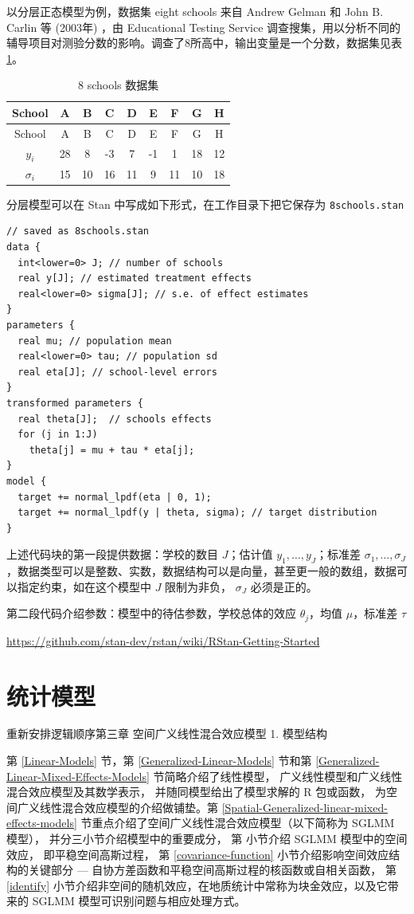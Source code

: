 \documentclass[12pt,a4paper,UTF8,twoside]{book}
\theoremstyle{definition}
\theoremstyle{definition}
\theoremstyle{definition}
\theoremstyle{remark}
\begin{document}
以分层正态模型为例，数据集 eight schools 来自 Andrew Gelman 和 John B.
Carlin 等 (2003年) \citep{Gelman2003}，由 Educational Testing Service
调查搜集，用以分析不同的辅导项目对测验分数的影响。调查了8所高中，输出变量是一个分数，数据集见表
\ref{tab:eight-high-schools}。

\begin{longtable}[]{@{}ccccccccc@{}}
\caption{\label{tab:eight-high-schools} 8 schools 数据集}\tabularnewline
\toprule
School & A & B & C & D & E & F & G & H\tabularnewline
\midrule
\endfirsthead
\toprule
School & A & B & C & D & E & F & G & H\tabularnewline
\midrule
\endhead
\(y_i\) & 28 & 8 & -3 & 7 & -1 & 1 & 18 & 12\tabularnewline
\(\sigma_i\) & 15 & 10 & 16 & 11 & 9 & 11 & 10 & 18\tabularnewline
\bottomrule
\end{longtable}

分层模型可以在 Stan 中写成如下形式，在工作目录下把它保存为
\texttt{8schools.stan}

\begin{verbatim}
// saved as 8schools.stan
data {
  int<lower=0> J; // number of schools 
  real y[J]; // estimated treatment effects
  real<lower=0> sigma[J]; // s.e. of effect estimates 
}
parameters {
  real mu; // population mean
  real<lower=0> tau; // population sd
  real eta[J]; // school-level errors
}
transformed parameters {
  real theta[J];  // schools effects
  for (j in 1:J)
    theta[j] = mu + tau * eta[j];
}
model {
  target += normal_lpdf(eta | 0, 1);
  target += normal_lpdf(y | theta, sigma); // target distribution
}
\end{verbatim}

上述代码块的第一段提供数据：学校的数目 \(J\)；估计值
\(y_1,\ldots,y_{J}\)；标准差
\(\sigma_1,\ldots,\sigma_{J}\)，数据类型可以是整数、实数，数据结构可以是向量，甚至更一般的数组，数据可以指定约束，如在这个模型中
\(J\) 限制为非负， \(\sigma_{J}\) 必须是正的。

第二段代码介绍参数：模型中的待估参数，学校总体的效应 \(\theta_j\)，均值
\(\mu\)，标准差 \(\tau\)

\url{https://github.com/stan-dev/rstan/wiki/RStan-Getting-Started}

\hypertarget{models}{%
\chapter{统计模型}\label{models}}

{重新安排逻辑顺序第三章 空间广义线性混合效应模型 1. 模型结构}

第 \ref{Linear-Models} 节，第 \ref{Generalized-Linear-Models} 节和第
\ref{Generalized-Linear-Mixed-Effects-Models} 节简略介绍了线性模型，
广义线性模型和广义线性混合效应模型及其数学表示，
并随同模型给出了模型求解的 R 包或函数，
为空间广义线性混合效应模型的介绍做铺垫。第
\ref{Spatial-Generalized-linear-mixed-effects-models}
节重点介绍了空间广义线性混合效应模型（以下简称为 SGLMM 模型），
并分三小节介绍模型中的重要成分， 第 小节介绍 SGLMM 模型中的空间效应，
即平稳空间高斯过程， 第 \ref{covariance-function}
小节介绍影响空间效应结构的关键部分 ---
自协方差函数和平稳空间高斯过程的核函数或自相关函数， 第 \ref{identify}
小节介绍非空间的随机效应，在地质统计中常称为块金效应，以及它带来的 SGLMM
模型可识别问题与相应处理方式。
\end{document}
